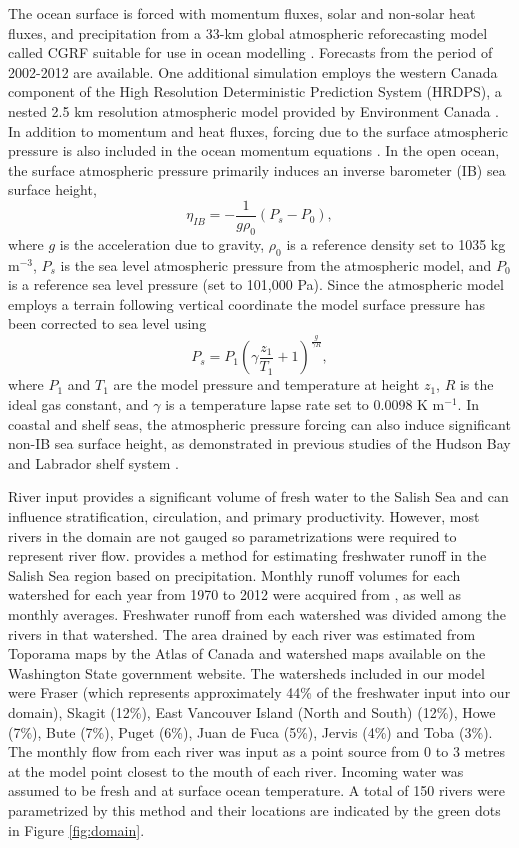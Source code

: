 \documentclass[letterpaper]{tATO2e}
\begin{document}
{\color{red} The ocean surface is forced with momentum fluxes, solar and non-solar heat fluxes, and precipitation from a 33-km global atmospheric reforecasting model {\color{red}called CGRF} suitable for use in ocean modelling \citep{smith2014new}.} Forecasts from the period of 2002-2012 are available. One additional simulation employs the western Canada component of the High Resolution Deterministic Prediction System (HRDPS), a nested 2.5 km resolution atmospheric model provided by Environment Canada \citep{ECModel}. In addition to momentum and heat fluxes, forcing due to the surface atmospheric pressure is also included in the ocean momentum equations \citep{madec2012nemo}. In the open ocean, the surface atmospheric pressure primarily induces an inverse barometer (IB) sea surface height,
\begin{equation}
 \eta_{IB} = -\frac{1}{g\rho_{0}}\left(P_{s}-P_0\right), \label{eq:inverse}
\end{equation}
where $g$ is the acceleration due to gravity, $\rho_{0}$ is a reference density set to 1035 kg m$^{-3}$, $P_{s}$ is the sea level atmospheric pressure from the atmospheric model, and $P_0$ is a reference sea level pressure (set to 101,000 Pa). Since the atmospheric model employs a terrain following vertical coordinate the model surface pressure has been corrected to sea level using \citep{holton1992introduction}
\[ P_s = P_1\left(\gamma\frac{z_1}{T_1} +1 \right)^\frac{g}{\gamma R},\]
where $P_1$ and $T_1$ are the model pressure and temperature at height $z_1$, $R$ is the ideal gas constant, and $\gamma$ is a temperature lapse rate set to 0.0098 K m$^{-1}$. In coastal and shelf seas, the atmospheric pressure forcing can also induce significant non-IB sea surface height, as demonstrated in previous studies of the Hudson Bay and Labrador shelf system \citep{wright1987influence,young1995synoptic}.

River input provides a significant volume of fresh water to the Salish Sea and can influence stratification, circulation, and primary productivity. However, most rivers in the domain are not gauged so parametrizations were required to represent river flow. \citet{morrison2011rivers} provides a method for estimating freshwater runoff in the Salish Sea region based on precipitation. Monthly runoff volumes for each watershed for each year from 1970 to 2012 were acquired from \citet{morrison2011rivers}, as well as monthly averages. Freshwater runoff from each watershed was divided among the rivers in that watershed. The area drained by each river was estimated from Toporama maps by the Atlas of Canada and watershed maps available on the Washington State government website. The watersheds included in our model were Fraser (which represents approximately 44\% of the freshwater input into our domain), Skagit (12\%), East Vancouver Island (North and South) (12\%), Howe (7\%), Bute (7\%), Puget (6\%), Juan de Fuca (5\%), Jervis (4\%) and Toba (3\%). The monthly flow from each river was input as a point source from 0 to 3 metres at the model point closest to the mouth of each river. Incoming water was assumed to be fresh and at surface {\color{red}ocean temperature}. A total of 150 rivers were parametrized by this method and their locations are indicated by the green dots in Figure \ref{fig:domain}.
\end{document}
